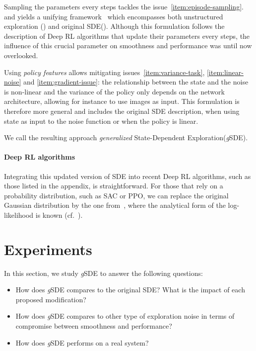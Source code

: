 \documentclass{article}
\newcommand{\cf}{cf.}
\newcommand{\sde}{State-Dependent Exploration\xspace}
\newcommand{\SDE}{\textsc{SDE}\xspace}
\newcommand{\ourSDE}{\textit{g}\textsc{SDE}\xspace}
\newcommand{\ppo}{\textsc{PPO}\xspace}
\newcommand{\sac}{\textsc{SAC}\xspace}
\begin{document}
Sampling the parameters  every  steps tackles the issue~\ref{item:episode-sampling}. and yields a unifying framework~\citep{hoof2017generalized} which encompasses both unstructured exploration () and original \SDE ().
Although this formulation follows the description of Deep RL algorithms that update their parameters every  steps, the influence of this crucial parameter on smoothness and performance was until now overlooked.


Using \textit{policy features} allows mitigating issues~\ref{item:variance-task}, \ref{item:linear-noise} and \ref{item:gradient-issue}: the relationship between the state  and the noise  is non-linear and the variance of the policy only depends on the network architecture, allowing for instance to use images as input.
This formulation is therefore more general and includes the original \SDE description, when using state as input to the noise function or when the policy is linear.



We call the resulting approach \textit{generalized} \sde (\ourSDE).

\paragraph{Deep RL algorithms}
Integrating this updated version of \SDE into recent Deep RL algorithms, such as those listed in the appendix,
is straightforward. For those that rely on a probability distribution, such as \sac or \ppo, we can replace the original Gaussian distribution by the one from~, where the analytical form of the log-likelihood is known (\cf~).




\section{Experiments}
\label{sec:experiments}

In this section, we study \ourSDE to answer the following questions:
\begin{itemize}
  \item How does \ourSDE compares to the original \SDE? What is the impact of each proposed modification?
  \item How does \ourSDE compares to other type of exploration noise in terms of compromise between smoothness and performance?
  \item How does \ourSDE performs on a real system?
\end{itemize}
\end{document}
